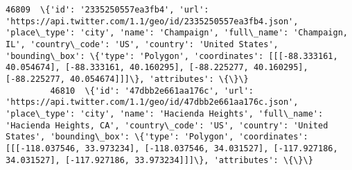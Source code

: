 \documentclass[11pt]{article}
\begin{document}
\begin{Verbatim}[commandchars=\\\{\}]
         46809  \{'id': '2335250557ea3fb4', 'url': 'https://api.twitter.com/1.1/geo/id/2335250557ea3fb4.json', 'place\_type': 'city', 'name': 'Champaign', 'full\_name': 'Champaign, IL', 'country\_code': 'US', 'country': 'United States', 'bounding\_box': \{'type': 'Polygon', 'coordinates': [[[-88.333161, 40.054674], [-88.333161, 40.160295], [-88.225277, 40.160295], [-88.225277, 40.054674]]]\}, 'attributes': \{\}\}                     
         46810  \{'id': '47dbb2e661aa176c', 'url': 'https://api.twitter.com/1.1/geo/id/47dbb2e661aa176c.json', 'place\_type': 'city', 'name': 'Hacienda Heights', 'full\_name': 'Hacienda Heights, CA', 'country\_code': 'US', 'country': 'United States', 'bounding\_box': \{'type': 'Polygon', 'coordinates': [[[-118.037546, 33.973234], [-118.037546, 34.031527], [-117.927186, 34.031527], [-117.927186, 33.973234]]]\}, 'attributes': \{\}\}   
         

\end{Verbatim}
\end{document}
